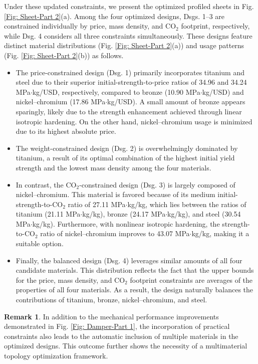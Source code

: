 \documentclass[preprint,11pt]{elsarticle}
\theoremstyle{definition}
\newtheorem{remark}{Remark}
\begin{document}
Under these updated constraints, we present the optimized profiled sheets in Fig. \ref{Fig: Sheet-Part 2}(a). Among the four optimized designs, Dsgs. 1--3 are constrained individually by price, mass density, and CO$_2$ footprint, respectively, while Dsg. 4 considers all three constraints simultaneously. These designs feature distinct material distributions (Fig. \ref{Fig: Sheet-Part 2}(a)) and usage patterns (Fig. \ref{Fig: Sheet-Part 2}(b)) as follows.
\begin{itemize}
    \item The price-constrained design (Dsg. 1) primarily incorporates titanium and steel due to their superior initial-strength-to-price ratios of 34.96 and 34.24 MPa$\cdot$kg/USD, respectively, compared to bronze (10.90 MPa$\cdot$kg/USD) and nickel--chromium (17.86 MPa$\cdot$kg/USD). A small amount of bronze appears sparingly, likely due to the strength enhancement achieved through linear isotropic hardening. On the other hand, nickel--chromium usage is minimized due to its highest absolute price.
    \item The weight-constrained design (Dsg. 2) is overwhelmingly dominated by titanium, a result of its optimal combination of the highest initial yield strength and the lowest mass density among the four materials.
    \item In contrast, the CO$_2$-constrained design (Dsg. 3) is largely composed of nickel--chromium. This material is favored because of its medium initial-strength-to-CO$_2$ ratio of 27.11 MPa$\cdot$kg/kg, which lies between the ratios of titanium (21.11 MPa$\cdot$kg/kg), bronze (24.17 MPa$\cdot$kg/kg), and steel (30.54 MPa$\cdot$kg/kg). Furthermore, with nonlinear isotropic hardening, the strength-to-CO$_2$ ratio of nickel--chromium improves to 43.07 MPa$\cdot$kg/kg, making it a suitable option.
    \item Finally, the balanced design (Dsg. 4) leverages similar amounts of all four candidate materials. This distribution reflects the fact that the upper bounds for the price, mass density, and CO$_2$ footprint constraints are averages of the properties of all four materials. As a result, the design naturally balances the contributions of titanium, bronze, nickel--chromium, and steel.
\end{itemize}

\begin{remark}
In addition to the mechanical performance improvements demonstrated in Fig. \ref{Fig: Damper-Part 1}, the incorporation of practical constraints also leads to the automatic inclusion of multiple materials in the optimized designs. This outcome further shows the necessity of a multimaterial topology optimization framework.
\end{remark}
\end{document}
